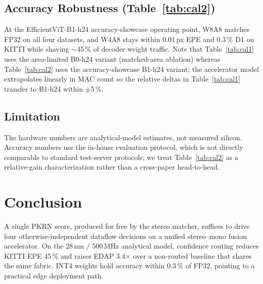 \documentclass[journal,twocolumn]{IEEEtran}
\begin{document}


\subsection{Accuracy Robustness (Table~\ref{tab:cal2})}
At the EfficientViT-B1-h24 accuracy-showcase operating point, W8A8 matches FP32 on all four datasets, and W4A8 stays within 0.01\,px EPE and 0.3\,\% D1 on KITTI while shaving $\sim$45\,\% of decoder weight traffic. Note that Table~\ref{tab:cal1} uses the area-limited B0-h24 variant (matched-area ablation) whereas Table~\ref{tab:cal2} uses the accuracy-showcase B1-h24 variant; the accelerator model extrapolates linearly in MAC count so the relative deltas in Table~\ref{tab:cal1} transfer to B1-h24 within $\pm$5\,\%.

\subsection{Limitation}
The hardware numbers are analytical-model estimates, not measured silicon. Accuracy numbers use the in-house evaluation protocol, which is not directly comparable to standard test-server protocols; we treat Table~\ref{tab:cal2} as a relative-gain characterization rather than a cross-paper head-to-head.

\section{Conclusion}
\label{sec:conclusion}
A single PKRN score, produced for free by the stereo matcher, suffices to drive four otherwise-independent dataflow decisions on a unified stereo--mono fusion accelerator. On the 28\,nm / 500\,MHz analytical model, confidence routing reduces KITTI EPE 45\,\% and raises EDAP 3.4$\times$ over a non-routed baseline that shares the same fabric. INT4 weights hold accuracy within 0.3\,\% of FP32, pointing to a practical edge deployment path.
\end{document}
